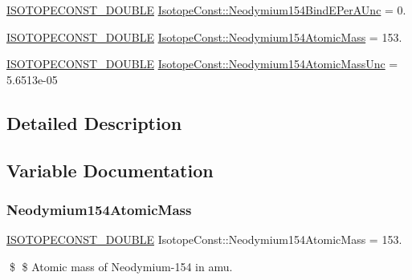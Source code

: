 \begin{DoxyCompactItemize}
\mbox{\hyperlink{group___isotope_const-_macros_ga8f45a7272ce02c0b4c65c44636ed719a}{I\+S\+O\+T\+O\+P\+E\+C\+O\+N\+S\+T\+\_\+\+D\+O\+U\+B\+LE}} \mbox{\hyperlink{group___isotope_const-_neodymium-_nd154_ga127cffcd29f24f3a77436907eb2b6179}{Isotope\+Const\+::\+Neodymium154\+Bind\+E\+Per\+A\+Unc}} = 0.
\item 
\mbox{\hyperlink{group___isotope_const-_macros_ga8f45a7272ce02c0b4c65c44636ed719a}{I\+S\+O\+T\+O\+P\+E\+C\+O\+N\+S\+T\+\_\+\+D\+O\+U\+B\+LE}} \mbox{\hyperlink{group___isotope_const-_neodymium-_nd154_gac25d5f8e72e2bd3b42e1636cdbc2e768}{Isotope\+Const\+::\+Neodymium154\+Atomic\+Mass}} = 153.
\item 
\mbox{\hyperlink{group___isotope_const-_macros_ga8f45a7272ce02c0b4c65c44636ed719a}{I\+S\+O\+T\+O\+P\+E\+C\+O\+N\+S\+T\+\_\+\+D\+O\+U\+B\+LE}} \mbox{\hyperlink{group___isotope_const-_neodymium-_nd154_gaee09901cc89933e998276f39dee65f2e}{Isotope\+Const\+::\+Neodymium154\+Atomic\+Mass\+Unc}} = 5.\+6513e-\/05
\end{DoxyCompactItemize}


\subsection{Detailed Description}


\subsection{Variable Documentation}
\mbox{\label{group___isotope_const-_neodymium-_nd154_gac25d5f8e72e2bd3b42e1636cdbc2e768}} 
\subsubsection{\texorpdfstring{Neodymium154\+Atomic\+Mass}{Neodymium154AtomicMass}}
{\footnotesize\ttfamily \mbox{\hyperlink{group___isotope_const-_macros_ga8f45a7272ce02c0b4c65c44636ed719a}{I\+S\+O\+T\+O\+P\+E\+C\+O\+N\+S\+T\+\_\+\+D\+O\+U\+B\+LE}} Isotope\+Const\+::\+Neodymium154\+Atomic\+Mass = 153.}

\$ \$ Atomic mass of Neodymium-\/154 in amu. \mbox{\label{group___isotope_const-_neodymium-_nd154_gaee09901cc89933e998276f39dee65f2e}} 
